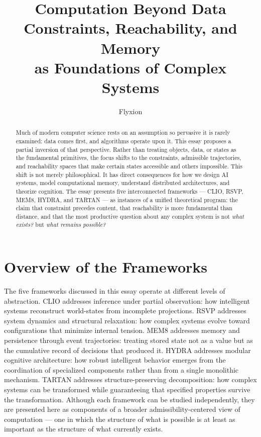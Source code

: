 \documentclass[11pt, a4paper]{article}
\title{%
  \textbf{Computation Beyond Data}\\[0.4em]
  \large Constraints, Reachability, and Memory\\
  as Foundations of Complex Systems
}
\author{Flyxion}
\date{}
\theoremstyle{named}
\begin{document}
\maketitle
\thispagestyle{empty}

\begin{abstract}
Much of modern computer science rests on an assumption so pervasive
it is rarely examined: data comes first, and algorithms operate upon
it. This essay proposes a partial inversion of that perspective.
Rather than treating objects, data, or states as the fundamental
primitives, the focus shifts to the constraints, admissible
trajectories, and reachability spaces that make certain states
accessible and others impossible. This shift is not merely
philosophical. It has direct consequences for how we design AI
systems, model computational memory, understand distributed
architectures, and theorize cognition. The essay presents five
interconnected frameworks --- CLIO, RSVP, MEM\textbar{}8, HYDRA, and
TARTAN --- as instances of a unified theoretical program: the claim
that constraint precedes content, that reachability is more
fundamental than distance, and that the most productive question about
any complex system is not \emph{what exists?} but \emph{what remains
possible?}
\end{abstract}

\newpage

\section*{Overview of the Frameworks}

The five frameworks discussed in this essay operate at different
levels of abstraction. CLIO addresses inference under partial
observation: how intelligent systems reconstruct world-states from
incomplete projections. RSVP addresses system dynamics and structural
relaxation: how complex systems evolve toward configurations that
minimize internal tension. MEM\textbar{}8 addresses memory and
persistence through event trajectories: treating stored state not as
a value but as the cumulative record of decisions that produced it.
HYDRA addresses modular cognitive architecture: how robust intelligent
behavior emerges from the coordination of specialized components
rather than from a single monolithic mechanism. TARTAN addresses
structure-preserving decomposition: how complex systems can be
transformed while guaranteeing that specified properties survive the
transformation. Although each framework can be studied independently,
they are presented here as components of a broader
admissibility-centered view of computation --- one in which the
structure of what is possible is at least as important as the
structure of what currently exists.
\end{document}
